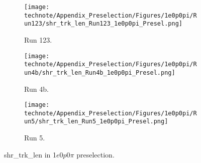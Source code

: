 \begin{figure}[H]
    \centering
    \begin{subfigure}[t]{0.32\linewidth}
        \texttt{[image: technote/Appendix\_Preselection/Figures/1e0p0pi/Run123/shr\_trk\_len\_Run123\_1e0p0pi\_Presel.png]}
        \caption{Run 123.}
    \end{subfigure}%
    \hspace{0.2cm}%
    \begin{subfigure}[t]{0.32\linewidth}
        \texttt{[image: technote/Appendix\_Preselection/Figures/1e0p0pi/Run4b/shr\_trk\_len\_Run4b\_1e0p0pi\_Presel.png]}
        \caption{Run 4b.}
    \end{subfigure}%
    \hspace{0.2cm}%
    \begin{subfigure}[t]{0.32\linewidth}
        \texttt{[image: technote/Appendix\_Preselection/Figures/1e0p0pi/Run5/shr\_trk\_len\_Run5\_1e0p0pi\_Presel.png]}
        \caption{Run 5.}
    \end{subfigure}
    \caption{shr\_trk\_len in 1$e$0$p$0$\pi$ preselection.}
\end{figure}